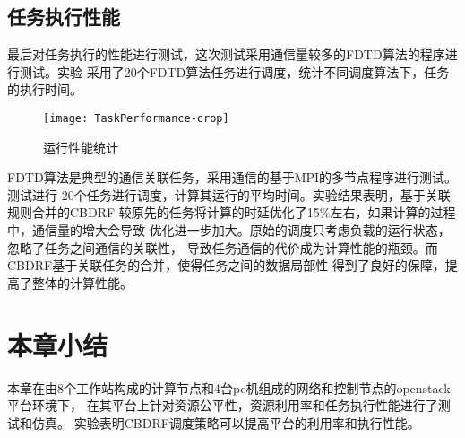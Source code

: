 \subsection{任务执行性能}
最后对任务执行的性能进行测试，这次测试采用通信量较多的FDTD算法的程序进行测试。实验
采用了20个FDTD算法任务进行调度，统计不同调度算法下，任务的执行时间。
\begin{figure}[htbp]
\centering\texttt{[image: TaskPerformance-crop]}
\caption{运行性能统计}\label{fig:TaskPerformance}
\end{figure}

FDTD算法是典型的通信关联任务，采用通信的基于MPI的多节点程序进行测试。测试进行
20个任务进行调度，计算其运行的平均时间。实验结果表明，基于关联规则合并的CBDRF
较原先的任务将计算的时延优化了15\%左右，如果计算的过程中，通信量的增大会导致
优化进一步加大。原始的调度只考虑负载的运行状态，忽略了任务之间通信的关联性，
导致任务通信的代价成为计算性能的瓶颈。而CBDRF基于关联任务的合并，使得任务之间的数据局部性
得到了良好的保障，提高了整体的计算性能。

\section{本章小结}
本章在由8个工作站构成的计算节点和4台pc机组成的网络和控制节点的openstack平台环境下，
在其平台上针对资源公平性，资源利用率和任务执行性能进行了测试和仿真。
实验表明CBDRF调度策略可以提高平台的利用率和执行性能。

